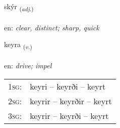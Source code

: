\documentclass[frontgrid, backgrid]{flacards}\usepackage[]{graphicx}\usepackage[]{color}
\begin{document}
\renewcommand{\flhead}{\vskip5pt \fboxsep=0pt {\small\bfseries\footnotesize Lýsingarorð | Adjective}}
\renewcommand{\fcfoot}{\vskip5pt \fboxsep=0pt \hspace{2pt}{\small\bfseries\footnotesize 2K}}

\renewcommand{\blhead}{\vskip5pt {\small\bfseries\footnotesize Lýsingarorð | Adjective }}
\renewcommand{\bcfoot}{\vskip5pt \hspace{2pt}{\small\bfseries\footnotesize 2K}}


{skýr \small{\textsubscript{(\textit{adj.})}} \\[1ex] %
\textphonetic{[sciːr]} \\
en: \emph{clear, distinct; sharp, quick} \\  [2ex]
\renewcommand*{\arraystretch}{0.8}
}

\renewcommand{\flhead}{\vskip5pt \fboxsep=0pt {\small\bfseries\footnotesize Sagnorð | Verb}}
\renewcommand{\fcfoot}{\vskip5pt \fboxsep=0pt \hspace{2pt}{\small\bfseries\footnotesize 2K}}

\renewcommand{\blhead}{\vskip5pt {\small\bfseries\footnotesize Sagnorð | Verb }}
\renewcommand{\bcfoot}{\vskip5pt \hspace{2pt}{\small\bfseries\footnotesize 2K}}


{keyra \small{\textsubscript{(\textit{v.})}} \\[1ex] %
\textphonetic{[cʰeiːra]} \\
en: \emph{drive; impel} \\  [2ex]
\renewcommand*{\arraystretch}{0.8}
\begin{tabular}{p{1cm}l}
\textsc{1sg}: & keyri -- keyrði -- keyrt \\ 
\textsc{2sg}: & keyrir -- keyrðir -- keyrt \\ 
\textsc{3sg}: & keyrir -- keyrði -- keyrt \\ 
\end{tabular}
}
\end{document}
